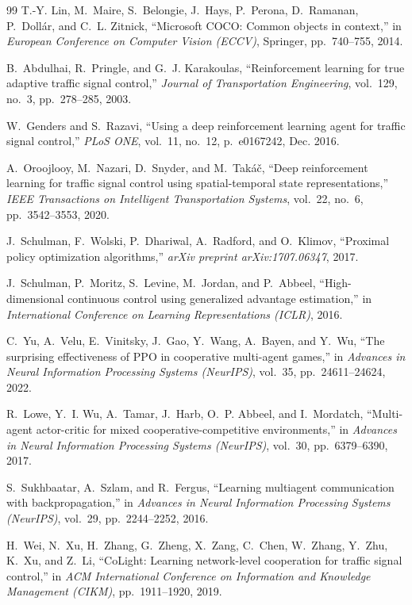\documentclass[12pt,a4paper,oneside]{report}
\begin{document}
\begin{small}
\begin{thebibliography}{99}
T.-Y. Lin, M.~Maire, S.~Belongie, J.~Hays, P.~Perona, D.~Ramanan, P.~Doll{\'a}r, and C.~L. Zitnick, ``Microsoft COCO: Common objects in context,'' in \emph{European Conference on Computer Vision (ECCV)}, Springer, pp.~740--755, 2014.

B.~Abdulhai, R.~Pringle, and G.~J. Karakoulas, ``Reinforcement learning for true adaptive traffic signal control,'' \emph{Journal of Transportation Engineering}, vol.~129, no.~3, pp.~278--285, 2003.

W.~Genders and S.~Razavi, ``Using a deep reinforcement learning agent for traffic signal control,'' \emph{PLoS ONE}, vol.~11, no.~12, p.~e0167242, Dec. 2016.

A.~Oroojlooy, M.~Nazari, D.~Snyder, and M.~Tak{\'a}{\v{c}}, ``Deep reinforcement learning for traffic signal control using spatial-temporal state representations,'' \emph{IEEE Transactions on Intelligent Transportation Systems}, vol.~22, no.~6, pp.~3542--3553, 2020.

J.~Schulman, F.~Wolski, P.~Dhariwal, A.~Radford, and O.~Klimov, ``Proximal policy optimization algorithms,'' \emph{arXiv preprint arXiv:1707.06347}, 2017.

J.~Schulman, P.~Moritz, S.~Levine, M.~Jordan, and P.~Abbeel, ``High-dimensional continuous control using generalized advantage estimation,'' in \emph{International Conference on Learning Representations (ICLR)}, 2016.

C.~Yu, A.~Velu, E.~Vinitsky, J.~Gao, Y.~Wang, A.~Bayen, and Y.~Wu, ``The surprising effectiveness of PPO in cooperative multi-agent games,'' in \emph{Advances in Neural Information Processing Systems (NeurIPS)}, vol.~35, pp.~24611--24624, 2022.

R.~Lowe, Y.~I. Wu, A.~Tamar, J.~Harb, O.~P. Abbeel, and I.~Mordatch, ``Multi-agent actor-critic for mixed cooperative-competitive environments,'' in \emph{Advances in Neural Information Processing Systems (NeurIPS)}, vol.~30, pp.~6379--6390, 2017.

S.~Sukhbaatar, A.~Szlam, and R.~Fergus, ``Learning multiagent communication with backpropagation,'' in \emph{Advances in Neural Information Processing Systems (NeurIPS)}, vol.~29, pp.~2244--2252, 2016.

H.~Wei, N.~Xu, H.~Zhang, G.~Zheng, X.~Zang, C.~Chen, W.~Zhang, Y.~Zhu, K.~Xu, and Z.~Li, ``CoLight: Learning network-level cooperation for traffic signal control,'' in \emph{ACM International Conference on Information and Knowledge Management (CIKM)}, pp.~1911--1920, 2019.


\end{thebibliography}
\end{small}
\end{document}
